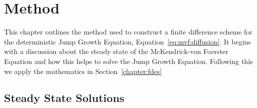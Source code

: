 \documentclass[../main.tex]{subfiles}
\begin{document}
  \chapter{Method}\label{chapter:method}
  This chapter outlines the method used to construct a finite difference scheme for the deterministic Jump Growth Equation, Equation~\ref{eq:mvf:diffusion}. It begins with a discussion about the steady state of the McKendrick-von Foerster Equation and how this helps to solve the Jump Growth Equation. Following this we apply the mathematics in Section~\ref{chapter:fdes}

  \section{Steady State Solutions}\label{sec:mvf:steadystate}
\end{document}
